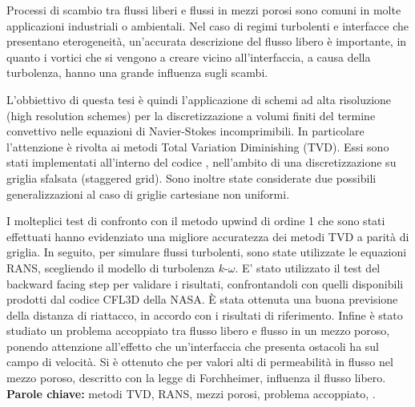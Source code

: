 Processi di scambio tra flussi liberi e flussi in mezzi porosi sono comuni in 
molte applicazioni industriali o ambientali. Nel caso di regimi turbolenti e 
interfacce che presentano eterogeneità, un'accurata descrizione del flusso 
libero è importante, in quanto i vortici che si vengono a creare vicino 
all'interfaccia, a causa della turbolenza, hanno una grande influenza sugli 
scambi.

L'obbiettivo di questa tesi è quindi l'applicazione di schemi ad alta 
risoluzione 
(high resolution schemes)
per la discretizzazione a volumi finiti del termine convettivo nelle equazioni 
di Navier-Stokes incomprimibili. In particolare l'attenzione è rivolta ai 
metodi Total Variation Diminishing (TVD). Essi sono stati implementati 
all'interno del codice \DUMUX, nell'ambito di una discretizzazione su griglia 
sfalsata (staggered grid). Sono inoltre state considerate due possibili 
generalizzazioni al caso di griglie cartesiane non 
uniformi.

I molteplici test di confronto con il metodo upwind di ordine 1 che sono stati 
effettuati hanno evidenziato una migliore accuratezza dei metodi TVD a parità 
di griglia. 
In seguito, per simulare flussi turbolenti, sono state utilizzate le equazioni 
RANS, scegliendo il modello di turbolenza $k\text{-}\omega$. E' stato 
utilizzato il test del backward facing step per validare i risultati, 
confrontandoli con quelli disponibili prodotti dal codice CFL3D della NASA. È 
stata ottenuta una buona previsione della distanza di riattacco, in accordo con 
i risultati di riferimento. Infine è stato studiato un problema accoppiato tra 
flusso libero e flusso in un mezzo poroso, ponendo attenzione all'effetto che 
un'interfaccia che presenta ostacoli ha sul campo di velocità. Si è ottenuto 
che per valori alti di permeabilità in flusso nel mezzo poroso, descritto con 
la legge di Forchheimer, influenza il flusso libero.
\\[\baselineskip]
\textbf{Parole chiave:} metodi TVD, RANS, mezzi porosi, problema accoppiato, 
\DUMUX.